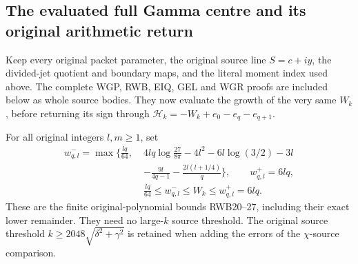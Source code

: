 \documentclass[11pt,a4paper]{article}
\begin{document}
\subsection{The evaluated full Gamma centre and its original arithmetic return}

Keep every original packet parameter, the original source line
$S=c+iy$, the divided-jet quotient and boundary maps, and the literal
moment index used above. The complete WGP, RWB, EIQ, GEL and WGR
proofs are included below as whole source bodies. They now evaluate
the growth of the very same $W_k$, before returning its sign through
$\mathcal H_k=-W_k+e_0-e_q-e_{q+1}$.

For all original integers $l,m\geq1$, set
\[
\begin{aligned}
 w^-_{q,l}=\max\bigg\{\frac{lq}{64},\;&
 4lq\log\frac{27}{8\pi}-4l^2-6l\log(3/2)-3l\\
 &-\frac{9l}{4q-1}-\frac{2l(l+1/4)}q\bigg\},\qquad
 w^+_{q,l}=6lq,\\
 &\frac{lq}{64}\leq w^-_{q,l}\leq W_k\leq w^+_{q,l}=6lq.
\end{aligned}\tag{GRI1}
\]
These are the finite original-polynomial bounds RWB20--27, including
their exact lower remainder. They need no large-$k$ source threshold.
The original source threshold $k\geq2048\sqrt{\delta^2+\gamma^2}$
is retained when adding the errors of the $\chi$-source comparison.
\end{document}

